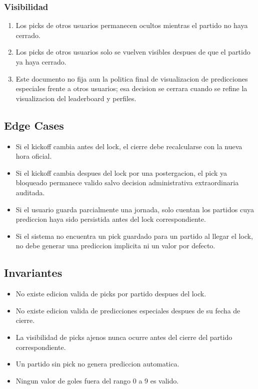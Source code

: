 \subsubsection{Visibilidad}

\begin{enumerate}
  \item Los picks de otros usuarios permanecen ocultos mientras el partido no haya cerrado.
  \item Los picks de otros usuarios solo se vuelven visibles despues de que el partido ya haya cerrado.
  \item Este documento no fija aun la politica final de visualizacion de predicciones especiales frente a otros usuarios; esa decision se cerrara cuando se refine la visualizacion del leaderboard y perfiles.
\end{enumerate}

\subsection{Edge Cases}

\begin{itemize}
  \item Si el kickoff cambia antes del lock, el cierre debe recalcularse con la nueva hora oficial.
  \item Si el kickoff cambia despues del lock por una postergacion, el pick ya bloqueado permanece valido salvo decision administrativa extraordinaria auditada.
  \item Si el usuario guarda parcialmente una jornada, solo cuentan los partidos cuya prediccion haya sido persistida antes del lock correspondiente.
  \item Si el sistema no encuentra un pick guardado para un partido al llegar el lock, no debe generar una prediccion implicita ni un valor por defecto.
\end{itemize}

\subsection{Invariantes}

\begin{itemize}
  \item No existe edicion valida de picks por partido despues del lock.
  \item No existe edicion valida de predicciones especiales despues de su fecha de cierre.
  \item La visibilidad de picks ajenos nunca ocurre antes del cierre del partido correspondiente.
  \item Un partido sin pick no genera prediccion automatica.
  \item Ningun valor de goles fuera del rango 0 a 9 es valido.
\end{itemize}

